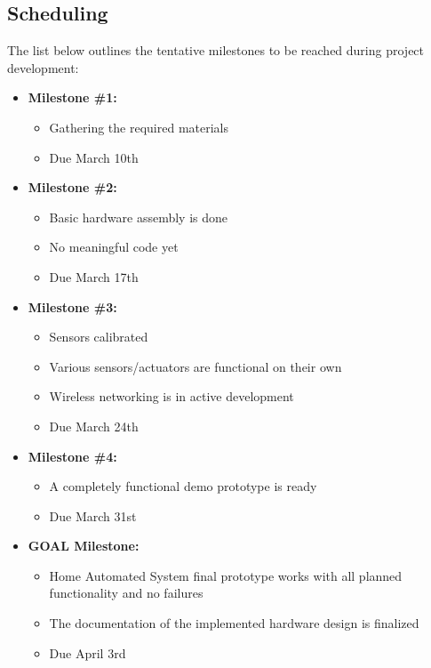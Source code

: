 \documentclass[journal]{IEEEtran}
\begin{document}
\subsection{Scheduling}
The list below outlines the tentative milestones to be reached during project development:
\begin{itemize}
	\item{\textbf{Milestone \#1:}}
		\begin{itemize}
		\item{Gathering the required materials}
		\item{Due March 10th}
		\end{itemize}
	\item{\textbf{Milestone \#2:}}
		\begin{itemize}
		\item{Basic hardware assembly is done}
		\item{No meaningful code yet}
		\item{Due March 17th}
		\end{itemize}
	\item{\textbf{Milestone \#3:}}
		\begin{itemize}
		\item{Sensors calibrated}
		\item{Various sensors/actuators are functional on their own}
		\item{Wireless networking is in active development}
		\item{Due March 24th}
		\end{itemize}
	\item{\textbf{Milestone \#4:}}
		\begin{itemize}
		\item{ A completely functional demo prototype is ready}
		\item{Due March 31st}
		\end{itemize}
	\item{\textbf{GOAL Milestone:}  }
		\begin{itemize}
		\item{Home Automated System final prototype works with all planned functionality and no failures}
		\item{The documentation of the implemented hardware design is finalized}
		\item{Due April 3rd}
		\end{itemize}
\end{itemize}
\end{document}
